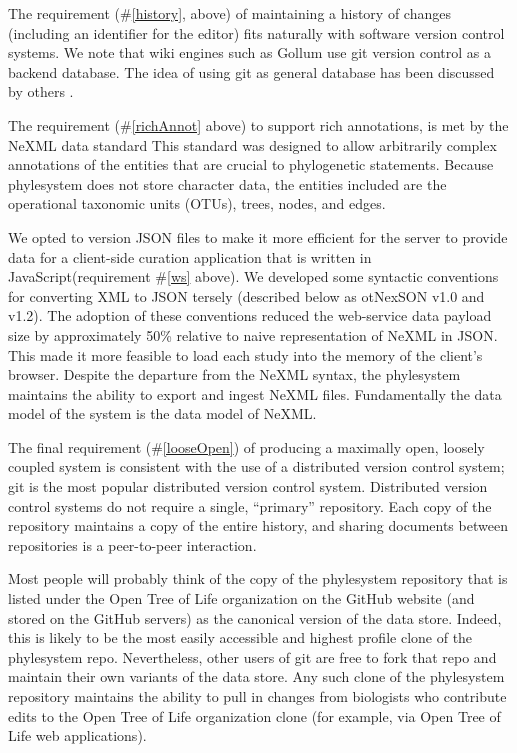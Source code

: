 \documentclass{bioinfo}
\newcommand{\ps}{phylesystem\xspace}
\newcommand{\otol}{Open Tree of Life\xspace}
\newcommand{\nexson}{otNexSON\xspace}
\newcommand{\js}{JavaScript\xspace}
\begin{document}
The requirement (\#\ref{history}, above) of maintaining a history of changes 
    (including an identifier for the editor) fits naturally with software version control systems.
We note that wiki engines such as Gollum use git version control as a backend database.
The idea of using git as general database has been discussed by others \citep{git-nosql-db}.

The requirement (\#\ref{richAnnot} above) to support rich annotations,
    is met by the NeXML data standard 
    This standard was designed
    to allow arbitrarily complex annotations of the entities that are crucial to phylogenetic statements.
Because \ps does not store character data, the entities included are the operational taxonomic units (OTUs), trees, nodes, and edges.

We opted to version JSON files to make it more efficient for the server to provide data for a client-side
    curation application that is written in \js (requirement \#\ref{ws} above).
We developed some syntactic conventions for converting XML to JSON tersely (described below as \nexson v1.0 and v1.2).
The adoption of these conventions reduced the web-service data payload size by approximately 50\% relative to 
    naive representation of NeXML in JSON.
This made it more feasible to load each study into the memory of the client's browser.
Despite the departure from the NeXML syntax, the \ps maintains the ability to export and ingest NeXML files.
Fundamentally the data model of the system is the data model of NeXML.

The final requirement (\#\ref{looseOpen}) of producing a maximally open,
    loosely coupled system is consistent with the use of a distributed
    version control system; git is the most popular distributed version control system.
Distributed version control systems do not require a single, ``primary'' repository.
Each copy of the repository maintains a copy of the entire history, and sharing documents between
    repositories is a peer-to-peer interaction.

Most people will probably think of the copy of the \ps repository that is listed under the \otol organization on
    the GitHub website (and stored on the GitHub servers) as the canonical version of the data store.
Indeed, this is likely to be the most easily accessible and highest profile clone of the \ps repo.
Nevertheless, other users of git are free to fork that repo and maintain their own variants of the data store.
Any such clone of the \ps repository maintains the ability to pull in changes from biologists who contribute
    edits to the \otol organization clone (for example, via \otol web applications).
\end{document}
